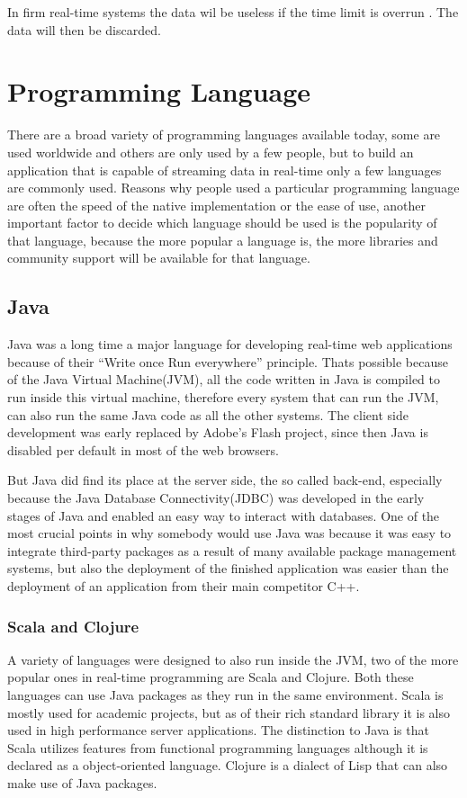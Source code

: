 In firm real-time systems the data wil be useless if the time limit is overrun \cite{RealTimeHermannKopetz}. The data will then be discarded.

\author{Nico Leidenfrost}
%
\section{Programming Language}
There are a broad variety of programming languages available today, some are used worldwide and others are only used by a few people, but to build an application that is capable of streaming data in real-time only a few languages are commonly used. Reasons why people used a particular programming language are often the speed of the native implementation or the ease of use, another important factor to decide which language should be used is the popularity of that language, because the more popular a language is, the more libraries and community support will be available for that language.

\subsection{Java}
Java was a long time a major language for developing real-time web applications because of their ``Write once Run everywhere'' principle. Thats possible because of the Java Virtual Machine(JVM), all the code written in Java is compiled to run inside this virtual machine, therefore every system that can run the JVM, can also run the same Java code as all the other systems. The client side development was early replaced by Adobe's Flash project, since then Java is disabled per default in most of the web browsers.

But Java did find its place at the server side, the so called back-end, especially because the Java Database Connectivity(JDBC) was developed in the early stages of Java and enabled an easy way to interact with databases. One of the most crucial points in why somebody would use Java was because it was easy to integrate third-party packages as a result of many available package management systems, but also the deployment of the finished application was easier than the deployment of an application from their main competitor C++.

\subsubsection{Scala and Clojure}
A variety of languages were designed to also run inside the JVM, two of the more popular ones in real-time programming are Scala and Clojure. Both these languages can use Java packages as they run in the same environment. Scala is mostly used for academic projects, but as of their rich standard library it is also used in high performance server applications. The distinction to Java is that Scala utilizes features from functional programming languages although it is declared as a object-oriented language. Clojure is a dialect of Lisp that can also make use of Java packages.

